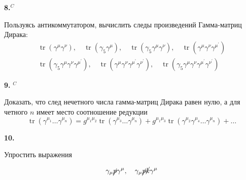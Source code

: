 \documentclass[a4paper,12pt]{article} %
\begin{document}
\begin{task}\textbf{8.}$^{C}$ 
	
	Пользуясь антикоммутатором, вычислить следы произведений Гамма-матриц Дирака:
$$
\begin{array}{l}
\operatorname{tr}\left(\gamma^{\mu} \gamma^{\nu}\right), 
\quad 
\operatorname{tr}\left(\gamma_{5} \gamma^{\mu}\right), 
\quad 
\operatorname{tr}\left(\gamma_{5} \gamma^{\mu} \gamma^{\nu}\right), 
\quad 
\operatorname{tr}\left(\gamma^{\mu} \gamma^{\nu} \gamma^{\mu^{\prime}}\right) 
\\
\operatorname{tr}\left(\gamma_{5} \gamma^{\mu} \gamma^{\nu} \gamma^{\mu^{\prime}}\right), 
\quad 
\operatorname{tr}\left(\gamma^{\mu} \gamma^{\nu} \gamma^{\mu^{\prime}} \gamma^{\nu^{\prime}}\right), 
\quad 
\operatorname{tr}\left(\gamma_{5} \gamma^{\mu} \gamma^{\nu} \gamma^{\mu^{\prime}} \gamma^{\nu^{\prime}}\right)
\end{array}
$$












\end{task}



\begin{task}\textbf{9.} $^{C}$ 

Доказать, что след нечетного числа гамма-матриц Дирака равен нулю, а для четного $n$ имеет место соотношение редукции
$$
\operatorname{tr}\left(\gamma^{\mu_{1}} \ldots \gamma^{\mu_{n}}\right)=
g^{\mu_{1} \mu_{2}} \operatorname{tr}\left(\gamma^{\mu_{3}} \ldots \gamma^{\mu_{n}}\right)+
g^{\mu_{1} \mu_{3}} \operatorname{tr}\left(\gamma^{\mu_{2}} \gamma^{\mu_{4}} \ldots \gamma^{\mu_{n}}\right)+
\ldots
$$
























\end{task}



\begin{task} \textbf{10.} 

Упростить выражения

$$
\gamma_{\mu} \cancel{p} \gamma^{\mu}, \quad \gamma_{\mu} \cancel{p} \cancel{k} \gamma^{\mu}
$$























\end{task}
\end{document}
